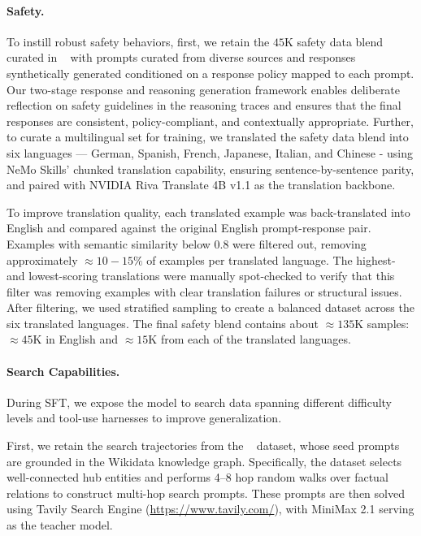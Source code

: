 \paragraph{Safety.}
To instill robust safety behaviors, first, we retain the $45$K safety data blend curated in \supermodel~\citep{nvidia2026nemotron3superopen} with prompts curated from diverse sources and responses synthetically generated conditioned on a response policy mapped to each prompt. Our two-stage response and reasoning generation framework enables deliberate reflection on safety guidelines in the reasoning traces and ensures that the final responses are consistent, policy-compliant, and contextually appropriate. Further, to curate a multilingual set for \ourmodel training, we translated the \supermodel safety data blend into six languages — German, Spanish, French, Japanese, Italian, and Chinese - using NeMo Skills' chunked translation capability, ensuring sentence-by-sentence parity, and paired with NVIDIA Riva Translate 4B v1.1 as the translation backbone. 

To improve translation quality, each translated example was back-translated into English and compared against the original English prompt-response pair. Examples with semantic similarity below 0.8 were filtered out, removing approximately $\approx10 - 15\%$ of examples per translated language. The highest- and lowest-scoring translations were manually spot-checked to verify that this filter was removing examples with clear translation failures or structural issues. After filtering, we used stratified sampling to create a balanced dataset across the six translated languages. The final safety blend contains about $\approx135$K samples: $\approx45$K in English and $\approx15$K from each of the translated languages.

\paragraph{Search Capabilities.}
During SFT, we expose the model to search data spanning different difficulty levels and tool-use harnesses to improve generalization.

First, we retain the search trajectories from the \supermodel~\citep{nvidia2026nemotron3superopen} dataset, whose seed prompts are grounded in the Wikidata knowledge graph. Specifically, the dataset selects well-connected hub entities and performs 4--8 hop random walks over factual relations to construct multi-hop search prompts. These prompts are then solved using Tavily Search Engine (\url{https://www.tavily.com/}), with MiniMax 2.1 serving as the teacher model.

